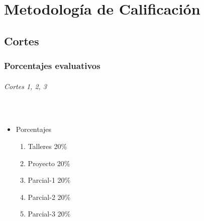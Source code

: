 \documentclass[a4paper]{report} %
\begin{document}
    \part{Metodología de Calificación}
      \chapter{Cortes}
        \section{Porcentajes evaluativos}
          \paragraph{Cortes 1, 2, 3}\mbox{}\\
            \begin{itemize}
              \item Porcentajes
              \begin{enumerate}
                \item Talleres 20\%
                \item Proyecto 20\%
                \item Parcial-1 20\%
                \item Parcial-2 20\%
                \item Parcial-3 20\%
              \end{enumerate}
            \end{itemize}
\end{document}
